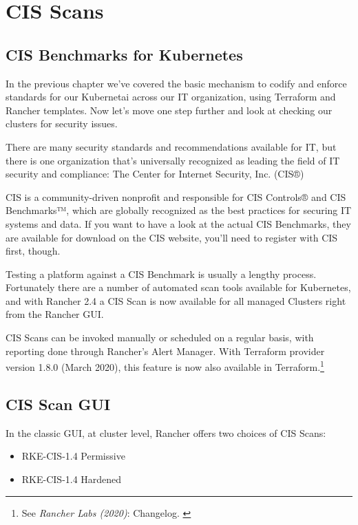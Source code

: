 %
%

\pagebreak
\section{CIS Scans}

\onehalfspacing

\subsection{CIS Benchmarks for Kubernetes}

In the previous chapter we've covered the basic mechanism to codify and enforce standards for our Kubernetai across our IT organization, using Terraform and Rancher templates. Now let's move one step further and look at checking our clusters for security issues.

There are many security standards and recommendations available for IT, but there is one organization that's universally recognized as leading the field of IT security and compliance: The Center for Internet Security, Inc. (CIS®)

CIS is a community-driven nonprofit and responsible for CIS Controls® and CIS Benchmarks™, which are globally recognized as the best practices for securing IT systems and data. If you want to have a look at the actual CIS Benchmarks, they are available for download on the CIS website, you'll need to register with CIS first, though.

Testing a platform against a CIS Benchmark is usually a lengthy process. Fortunately there are a number of automated scan tools available for Kubernetes, and with Rancher 2.4 a CIS Scan is now available for all managed Clusters right from the Rancher GUI.

CIS Scans can be invoked manually or scheduled on a regular basis, with reporting done through Rancher's Alert Manager. With Terraform provider version 1.8.0 (March 2020), this feature is now also available in Terraform.\footnote{See \textit{Rancher Labs (2020)}: Changelog. \cite{ChangeLog}}

\subsection{CIS Scan GUI}

In the classic GUI, at cluster level, Rancher offers two choices of CIS Scans:

\begin{itemize}
\item RKE-CIS-1.4 Permissive
\item RKE-CIS-1.4 Hardened
\end{itemize}

